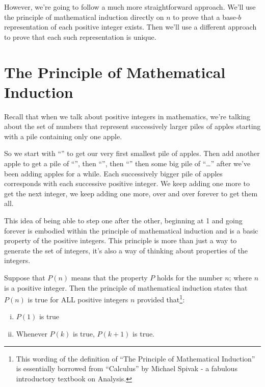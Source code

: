 \documentclass{article}
\begin{document}
However, we're going to follow a much more straightforward approach.
We'll use the principle of mathematical induction directly on $n$
to prove that
a base-$b$ representation of each positive integer exists.
Then we'll use a different approach to prove that each such representation is unique.

\section*{The Principle of Mathematical Induction}

Recall that
when we talk about positive integers in mathematics, we're talking about
the set of numbers that
represent successively larger piles of apples starting
with a pile containing only one apple.

So we start with
``\faApple{}'' to get our very first
smallest pile of apples.
Then add another apple to get a pile of ``\faApple{}\faApple{}'',
then ``\faApple{}\faApple{}\faApple{}'',
then ``\faApple{}\faApple{}\faApple{}\faApple{}''
then some big pile of
``\faApple{}\faApple{}\faApple{}\faApple{}\faApple{}\dots{}\faApple{}\faApple{}\faApple{}''
after we've been adding apples for a while.
Each successively bigger pile of apples corresponds with each successive positive integer.
We keep adding one more to get the next integer, we keep adding one more,
over and over forever to get them all.


This idea of being able to step one after the other,
beginning at 1 and going forever is embodied within the principle of mathematical
induction and is a basic property of the positive integers.
This principle is more than just a way to generate the set of integers,
it's also a way of thinking about properties of the integers.

Suppose
that $P(n)$ means that the property $P$ holds
for the number $n$; where $n$ is a positive integer.
Then the principle of mathematical induction states that $P(n)$
is true for ALL positive integers $n$ provided that\footnote{This wording of the
definition of ``The Principle of Mathematical Induction'' is essentially borrowed
from ``Calculus'' by Michael Spivak - a fabulous introductory textbook on Analysis.}:

\begin{enumerate}[i)]
\item $P(1)$ is true
\item Whenever $P(k)$ is true, $P(k+1)$ is true.
\end{enumerate}
\end{document}
